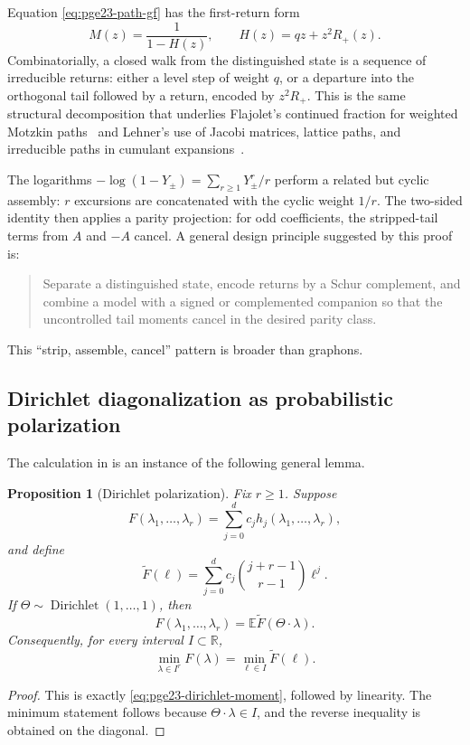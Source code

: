 \documentclass[11pt]{article}
\newtheorem{proposition}[theorem]{Proposition}
\numberwithin{equation}{section}
\newcommand{\R}{\mathbb R}
\newcommand{\E}{\mathbb E}
\begin{document}
Equation \eqref{eq:pge23-path-gf} has the first-return form
\[
  M(z)=\frac{1}{1-H(z)},
  \qquad H(z)=qz+z^2R_+(z).
\]
Combinatorially, a closed walk from the distinguished state is a sequence of
irreducible returns: either a level step of weight $q$, or a departure into
the orthogonal tail followed by a return, encoded by $z^2R_+$.  This is
the same structural decomposition that underlies Flajolet's continued
fraction for weighted Motzkin paths~\cite{Flajolet1980} and Lehner's use of
Jacobi matrices, lattice paths, and irreducible paths in cumulant
expansions~\cite{Lehner2003}.

The logarithms $-\log(1-Y_\pm)=\sum_{r\ge1}Y_\pm^r/r$ perform a related
but cyclic assembly: $r$ excursions are concatenated with the cyclic
weight $1/r$.  The two-sided identity then applies a parity projection:
for odd coefficients, the stripped-tail terms from $A$ and $-A$ cancel.
A general design principle suggested by this proof is:
\begin{quote}
  Separate a distinguished state, encode returns by a Schur complement, and
  combine a model with a signed or complemented companion so that the
  uncontrolled tail moments cancel in the desired parity class.
\end{quote}
This ``strip, assemble, cancel'' pattern is broader than graphons.

\subsection{Dirichlet diagonalization as probabilistic polarization}

The calculation in  is an instance of the following
general lemma.

\begin{proposition}[Dirichlet polarization]\label{prop:general-dirichlet}
  Fix $r\ge1$.  Suppose
  \[
    F(\lambda_1,\ldots,\lambda_r)
    =\sum_{j=0}^d c_jh_j(\lambda_1,\ldots,\lambda_r),
  \]
  and define
  \[
    \widetilde F(\ell)
    =\sum_{j=0}^d c_j\binom{j+r-1}{r-1}\ell^j.
  \]
  If $\Theta\sim\operatorname{Dirichlet}(1,\ldots,1)$, then
  \[
    F(\lambda_1,\ldots,\lambda_r)
    =\E\widetilde F(\Theta\cdot\lambda).
  \]
  Consequently, for every interval $I\subset\R$,
  \[
    \min_{\lambda\in I^r}F(\lambda)
    =\min_{\ell\in I}\widetilde F(\ell).
  \]
\end{proposition}

\begin{proof}
  This is exactly \eqref{eq:pge23-dirichlet-moment}, followed by linearity.
  The minimum statement follows because $\Theta\cdot\lambda\in I$, and the
  reverse inequality is obtained on the diagonal.
\end{proof}
\end{document}
